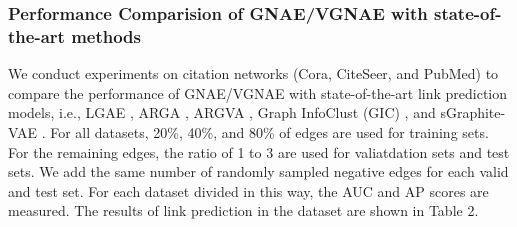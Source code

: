 \documentclass[sigconf]{acmart}
\begin{document}
\subsubsection{Performance Comparision of GNAE/VGNAE with state-of-the-art methods}
We conduct experiments on citation networks (Cora, CiteSeer, and PubMed) to compare the performance of GNAE/VGNAE with state-of-the-art link prediction models, i.e., LGAE \cite{salha2020simple}, ARGA \cite{pan2018adversarially}, ARGVA \cite{pan2018adversarially}, Graph InfoClust (GIC) \cite{mavromatis2020graph}, and sGraphite-VAE \cite{di2020mutual}.
For all datasets, 20\%, 40\%,  and 80\% of edges are used for training sets.
For the remaining edges, the ratio of 1 to 3 are used for valiatdation sets and test sets.
We add the same number of randomly sampled negative edges for each valid and test set.
For each dataset divided in this way, the AUC and AP scores are measured.
The results of link prediction in the dataset are shown in Table 2.

\renewcommand{\tabcolsep}{3pt}
\end{document}
